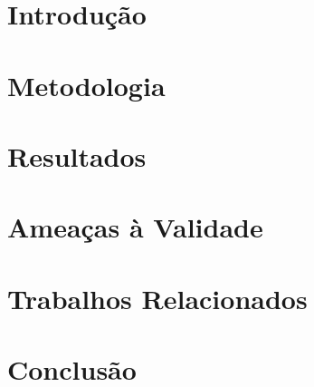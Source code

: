 \documentclass[sigconf]{acmart}
\begin{document}


\maketitle

\section{Introdução}


\section{Metodologia}
\label{metodologia}


\section{Resultados}
\label{resultados}



% 

\section{Ameaças à Validade}
\label{ameacas}


\section{Trabalhos Relacionados}
\label{relacionados}


\section{Conclusão}
\label{conclusao}




 
\end{document}
